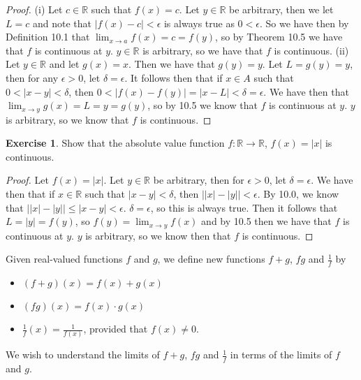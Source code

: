 \documentclass[12pt]{article}
\newcommand{\bbR}{\mathbb{R}}
\providecommand{\abs}[1]{\lvert #1 \rvert}
\renewcommand{\_}[1]{\underline{ #1 }}
\newtheorem{lemma}[theorem]{Lemma}
\theoremstyle{definition}
\newtheorem{exercise}[theorem]{Exercise}
\numberwithin{equation}{subsection}
\begin{document}
\begin{proof}
(i) Let $c \in \bbR$ such that $f(x) = c$. Let $y \in \bbR$ be arbitrary, then we let $L = c$ and note that $\abs{f(x) - c} < \epsilon$ is always true as $0 < \epsilon$. So we have then by Definition 10.1 that $\lim_{x \to a}f(x) = c = f(y)$, so by Theorem 10.5 we have that $f$ is continuous at $y$. $y \in \bbR$ is arbitrary, so we have that $f$ is continuous. \newline
(ii) Let $y \in \bbR$ and let $g(x) = x$. Then we have that $g(y) = y$. Let $L = g(y) = y$, then for any $\epsilon > 0$, let $\delta = \epsilon$. It follows then that if $x \in A$ such that $0 < \abs{x - y} < \delta$, then $0 < \abs{f(x) - f(y)} = \abs{x - L} < \delta = \epsilon$. We have then that $\lim_{x \to y}g(x) = L = y = g(y)$, so by 10.5 we know that $f$ is continuous at $y$. $y$ is arbitrary, so we know that $f$ is continuous.
\end{proof}


\begin{exercise}Show that the 
absolute value function $f:\bbR\to\bbR$, $f(x)=\abs{x}$ is continuous.
\end{exercise}

\begin{proof}
Let $f(x) = \abs{x}$. Let $y \in \bbR$ be arbitrary, then for $\epsilon > 0$, let $\delta = \epsilon$. We have then that if $x \in \bbR$ such that $\abs{x - y} < \delta$, then $\abs{\abs{x} - \abs{y}} < \epsilon$. By 10.0, we know that $\abs{\abs{x} - \abs{y}} \leq \abs{x - y} < \epsilon$. $\delta = \epsilon$, so this is always true. Then it follows that $L = \abs{y} = f(y)$, so $f(y) = \lim_{x \to y}f(x)$ and by 10.5 then we have that $f$ is continuous at $y$. $y$ is arbitrary, so we know then that $f$ is continuous.
\end{proof}

\noindent Given real-valued functions $f$ and $g$, we define new functions $f + g$, $fg$ and $\tfrac{1}{f}$ by
\begin{itemize}
\item $(f + g)(x) = f(x) + g(x)$
\item $(f g)(x) = f(x) \cdot g(x)$
\item $\tfrac{1}{f}(x) = \frac{1}{f(x)}$, provided that $f(x) \neq 0$.
\end{itemize}
We wish to understand the limits of $f + g$, $fg$ and $\frac{1}{f}$ in terms of the limits of $f$ and $g$.


\end{document}
